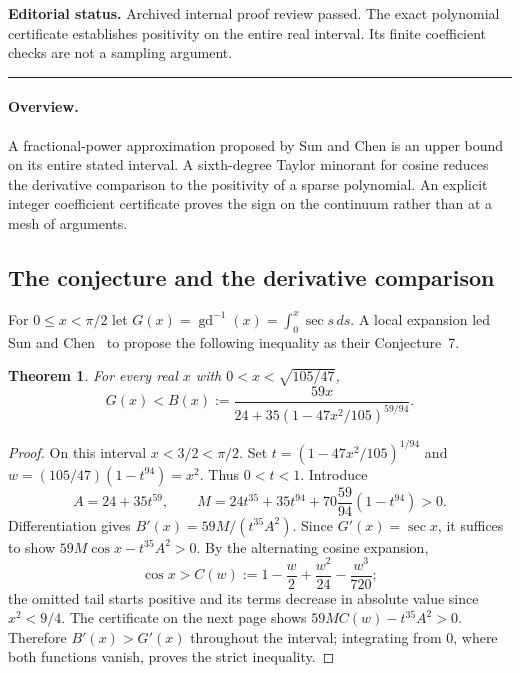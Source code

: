 \documentclass[11pt,a4paper]{article}
\newtheorem*{SourceRccStheorem}{Theorem}
\begin{document}
\noindent\textbf{Editorial status.} Archived internal proof review passed. The exact polynomial certificate establishes positivity on the entire real interval. Its finite coefficient checks are not a sampling argument.

\smallskip\hrule\medskip



\begingroup
\newcommand{\gd}{\operatorname{gd}}
\setcounter{equation}{0}
\renewcommand{\theequation}{\thesection.\arabic{equation}}
\renewcommand{\theHequation}{R22S.\arabic{equation}}
\paragraph{Overview.}
A fractional-power approximation proposed by Sun and Chen is an upper
bound on its entire stated interval. A sixth-degree Taylor minorant for
cosine reduces the derivative comparison to the positivity of a sparse
polynomial. An explicit integer coefficient certificate proves the sign
on the continuum rather than at a mesh of arguments.


\subsection*{The conjecture and the derivative comparison}
For $0\le x<\pi/2$ let $G(x)=\gd^{-1}(x)=\int_0^x\sec s\,ds$.
A local expansion led Sun and Chen~\cite[p.\,140]{R22S:SC} to propose the following
inequality as their Conjecture~7.
\begin{SourceRccStheorem}
For every real $x$ with $0<x<\sqrt{105/47}$,
\[
 G(x)<B(x):=\frac{59x}{24+35(1-47x^2/105)^{59/94}}.
\]
\end{SourceRccStheorem}
\begin{proof}
On this interval $x<3/2<\pi/2$. Set $t=(1-47x^2/105)^{1/94}$
and $w=(105/47)(1-t^{94})=x^2$. Thus $0<t<1$. Introduce
\[
 A=24+35t^{59},\qquad
 M=24t^{35}+35t^{94}+70\frac{59}{94}(1-t^{94})>0 .
\]
Differentiation gives $B'(x)=59 M/(t^{35}A^2)$. Since $G'(x)=\sec x$,
it suffices to show $59M\cos x-t^{35}A^2>0$. By the alternating
cosine expansion,
\[
 \cos x > C(w):=1-\frac w2+\frac{w^2}{24}-\frac{w^3}{720};
\]
the omitted tail starts positive and its terms decrease in absolute
value since $x^2<9/4$. The certificate on the next page shows
$59M C(w)-t^{35}A^2>0$. Therefore $B'(x)>G'(x)$ throughout the
interval; integrating from $0$, where both functions vanish, proves
the strict inequality.
\end{proof}
\end{document}

